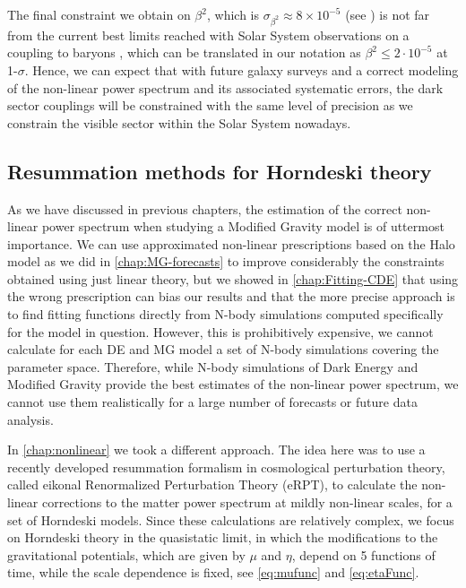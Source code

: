 The final constraint we obtain on $\beta^2$, which is $\sigma_{\beta^2} \approx 8\times 10^{-5}$ (see \cite{casas_fitting_2015})
is not far from the current
best limits reached with Solar System observations on a coupling to
baryons \cite{Agashe:2014kda}, which can be translated in our notation
as $\beta^{2}\le2\cdot10^{-5}$ at 1-$\sigma$.
Hence, we can expect that with future galaxy surveys and a correct modeling of the non-linear power spectrum and its associated
systematic errors, the dark sector couplings will be constrained with the same level of precision as we constrain the visible sector
within the Solar System nowadays.

\subsection*{Resummation methods for Horndeski theory}

As we have discussed in previous chapters, the estimation of the correct non-linear power spectrum when studying a Modified Gravity model
is of uttermost importance. We can use approximated non-linear prescriptions based on the Halo model as we did in \cref{chap:MG-forecasts}
to improve considerably the constraints obtained using just linear theory,
but we showed in \cref{chap:Fitting-CDE} that using the wrong prescription can bias our results and that the more precise approach is to 
find fitting functions directly from N-body simulations computed specifically for the model in question.
However, this is prohibitively expensive, we cannot calculate for each DE and MG model a set of N-body simulations covering
the parameter space. Therefore, while N-body simulations of Dark Energy and Modified Gravity provide 
the best estimates of the non-linear power spectrum, we cannot use them realistically for a large number of forecasts or future data analysis.

In \cref{chap:nonlinear} we took a different approach. The idea here was to use a recently developed resummation
formalism in cosmological perturbation theory, \\ called eikonal Renormalized Perturbation Theory (eRPT), to calculate 
the non-linear corrections to the matter power spectrum at mildly non-linear scales, for a set of Horndeski models.
Since these calculations are relatively complex, we focus on Horndeski theory in the quasistatic limit,
in which the modifications to the gravitational potentials, which are given by $\mu$ and $\eta$, depend on 5 functions
of time, while the scale dependence is fixed, see \cref{eq:mufunc} and \cref{eq:etaFunc}.


